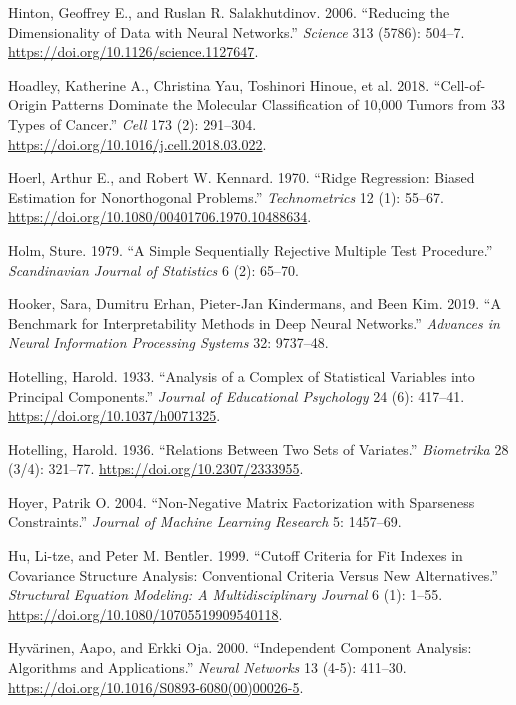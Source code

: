 \documentclass[
  10pt,
  letterpaper,
]{report}
\newlength{\cslhangindent}
\newenvironment{CSLReferences}[2] %
 {\begin{list}{}{%
  \setlength{\itemindent}{0pt}
  \setlength{\leftmargin}{0pt}
  \setlength{\parsep}{0pt}
  \ifodd #1
   \setlength{\leftmargin}{\cslhangindent}
   \setlength{\itemindent}{-1\cslhangindent}
  \fi
  \setlength{\itemsep}{#2\baselineskip}}}
 {\end{list}}
\begin{document}
\begin{CSLReferences}{1}{1}
Hinton, Geoffrey E., and Ruslan R. Salakhutdinov. 2006. {``Reducing the
Dimensionality of Data with Neural Networks.''} \emph{Science} 313
(5786): 504--7. \url{https://doi.org/10.1126/science.1127647}.

{Hoadley, Katherine A., Christina Yau, Toshinori Hinoue, et al.} 2018.
{``Cell-of-Origin Patterns Dominate the Molecular Classification of
10,000 Tumors from 33 Types of Cancer.''} \emph{Cell} 173 (2): 291--304.
\url{https://doi.org/10.1016/j.cell.2018.03.022}.

Hoerl, Arthur E., and Robert W. Kennard. 1970. {``Ridge Regression:
Biased Estimation for Nonorthogonal Problems.''} \emph{Technometrics} 12
(1): 55--67. \url{https://doi.org/10.1080/00401706.1970.10488634}.

Holm, Sture. 1979. {``A Simple Sequentially Rejective Multiple Test
Procedure.''} \emph{Scandinavian Journal of Statistics} 6 (2): 65--70.

Hooker, Sara, Dumitru Erhan, Pieter-Jan Kindermans, and Been Kim. 2019.
{``A Benchmark for Interpretability Methods in Deep Neural Networks.''}
\emph{Advances in Neural Information Processing Systems} 32: 9737--48.

Hotelling, Harold. 1933. {``Analysis of a Complex of Statistical
Variables into Principal Components.''} \emph{Journal of Educational
Psychology} 24 (6): 417--41. \url{https://doi.org/10.1037/h0071325}.

Hotelling, Harold. 1936. {``Relations Between Two Sets of Variates.''}
\emph{Biometrika} 28 (3/4): 321--77.
\url{https://doi.org/10.2307/2333955}.

Hoyer, Patrik O. 2004. {``Non-Negative Matrix Factorization with
Sparseness Constraints.''} \emph{Journal of Machine Learning Research}
5: 1457--69.

Hu, Li-tze, and Peter M. Bentler. 1999. {``Cutoff Criteria for Fit
Indexes in Covariance Structure Analysis: Conventional Criteria Versus
New Alternatives.''} \emph{Structural Equation Modeling: A
Multidisciplinary Journal} 6 (1): 1--55.
\url{https://doi.org/10.1080/10705519909540118}.

Hyvärinen, Aapo, and Erkki Oja. 2000. {``Independent Component Analysis:
Algorithms and Applications.''} \emph{Neural Networks} 13 (4-5):
411--30. \url{https://doi.org/10.1016/S0893-6080(00)00026-5}.


\end{CSLReferences}
\end{document}
